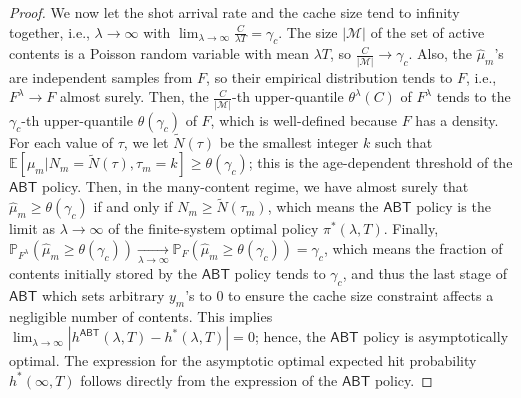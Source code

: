 \documentclass[10pt, conference, letterpaper]{IEEEtran}
\newcommand{\ABT}{\textsf{ABT}}
\newcommand{\mean}[1]{\mathbb{E}\!\left[#1\right]}
\def\Mcal{\mathcal{M}}
\def\PP{\mathbb{P}}
\begin{document}
\begin{proof}
We now let the shot arrival rate and the cache size tend to infinity together, i.e., $\lambda\to\infty$ with $\lim_{\lambda\to\infty}\frac{C}{\lambda T}=\gamma_c$. The size $|\Mcal|$ of the set of active contents is a Poisson random variable with mean $\lambda T$, so $\frac C{|\Mcal|}\to\gamma_c$. Also, the $\widehat \mu_m$'s are independent samples from $F$, so their empirical distribution tends to $F$, i.e., $F^\lambda\to F$ almost surely. Then, the $\frac C{|\Mcal|}$-th upper-quantile $\theta^\lambda(C)$ of $F^\lambda$ tends to the $\gamma_c$-th upper-quantile $\theta(\gamma_c)$ of $F$, which is well-defined because $F$ has a density. For each value of $\tau$, we let $\widetilde N(\tau)$ be the smallest integer $k$ such that $\mean{\mu_m\big|N_m=\widetilde N(\tau),\tau_m=k}\geq\theta(\gamma_c)$; this is the age-dependent threshold of the $\ABT$ policy.
Then, in the many-content regime, we have almost surely that $\widehat \mu_m\geq\theta(\gamma_c)$ if and only if $N_m\geq\widetilde N(\tau_m)$, which means the $\ABT$ policy is the limit as $\lambda\to\infty$ of the finite-system optimal policy $\pi^*(\lambda,T)$. Finally, $\PP_{F^\lambda}\left(\widehat \mu_m\geq\theta(\gamma_c)\right)\underset{\lambda\to\infty}\to \PP_F\left(\widehat \mu_m\geq\theta(\gamma_c)\right)=\gamma_c$, which means the fraction of contents initially stored by the $\ABT$ policy tends to $\gamma_c$, and thus the last stage of $\ABT$ which sets arbitrary $y_m$'s to 0 to ensure the cache size constraint affects a negligible number of contents. This implies $\lim_{\lambda\to\infty} \left|h^{\ABT}(\lambda,T)-h^*(\lambda,T)\right|=0$; hence, the $\ABT$ policy is asymptotically optimal. The expression for the asymptotic optimal expected hit probability $h^*(\infty,T)$ follows directly from the expression of the $\ABT$ policy.
\end{proof}
\end{document}
